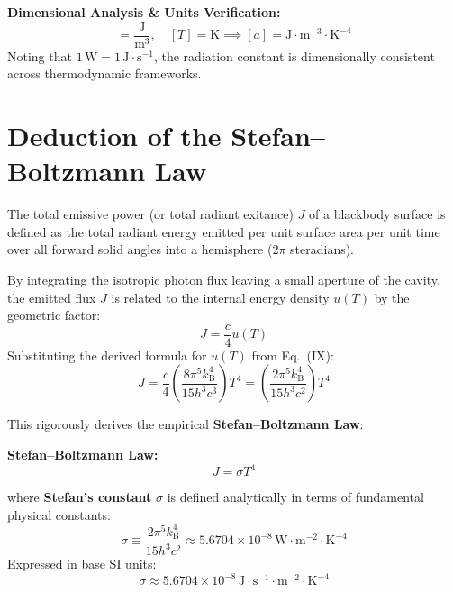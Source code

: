 \documentclass[11pt,a4paper]{article}
\newcommand{\kB}{k_{\mathrm{B}}}
\begin{document}
\begin{postulatebox}
\textbf{Dimensional Analysis \& Units Verification:}
\begin{equation*}
    [u(T)] = \frac{\mathrm{J}}{\mathrm{m}^3}, \quad [T] = \mathrm{K} \implies [a] = \mathrm{J}\cdot\mathrm{m}^{-3}\cdot\mathrm{K}^{-4}
\end{equation*}
Noting that $1\,\mathrm{W} = 1\,\mathrm{J}\cdot\mathrm{s}^{-1}$, the radiation constant is dimensionally consistent across thermodynamic frameworks.
\end{postulatebox}

\section{Deduction of the Stefan--Boltzmann Law}

The total emissive power (or total radiant exitance) $J$ of a blackbody surface is defined as the total radiant energy emitted per unit surface area per unit time over all forward solid angles into a hemisphere ($2\pi$ steradians).

By integrating the isotropic photon flux leaving a small aperture of the cavity, the emitted flux $J$ is related to the internal energy density $u(T)$ by the geometric factor:
\begin{equation}
    J = \frac{c}{4} u(T)
\end{equation}
Substituting the derived formula for $u(T)$ from Eq.~(IX):
\begin{equation}
    J = \frac{c}{4} \left( \frac{8\pi^5 \kB^4}{15 h^3 c^3} \right) T^4 = \left( \frac{2\pi^5 \kB^4}{15 h^3 c^2} \right) T^4
\end{equation}

This rigorously derives the empirical \textbf{Stefan--Boltzmann Law}:

\begin{resultbox}
\textbf{Stefan--Boltzmann Law:}
\begin{equation}
    \boxed{J = \sigma T^4} \tag{X}
\end{equation}
\end{resultbox}
where \textbf{Stefan's constant} $\sigma$ is defined analytically in terms of fundamental physical constants:
\begin{equation}
    \sigma \equiv \frac{2\pi^5 \kB^4}{15 h^3 c^2} \approx 5.6704 \times 10^{-8} \,\mathrm{W}\cdot\mathrm{m}^{-2}\cdot\mathrm{K}^{-4}
\end{equation}
Expressed in base SI units:
\begin{equation}
    \sigma \approx 5.6704 \times 10^{-8} \,\mathrm{J}\cdot\mathrm{s}^{-1}\cdot\mathrm{m}^{-2}\cdot\mathrm{K}^{-4}
\end{equation}
\end{document}
